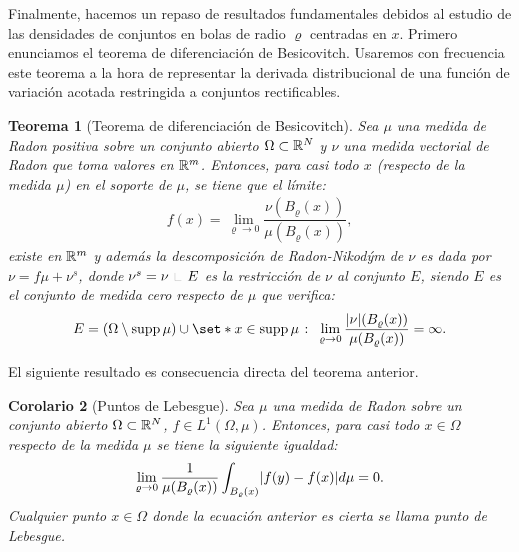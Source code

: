 \documentclass[a4paper,11pt,spanish, twoside, leqno]{tfm-uam}
\newtheorem{teo}{Teorema}[chapter]
\newtheorem{cor}[teo]{Corolario}
\begin{document}
Finalmente, hacemos un repaso de resultados fundamentales debidos al estudio de las densidades de conjuntos en bolas de radio $\varrho$ centradas en $x$. Primero enunciamos el teorema de diferenciación de Besicovitch. Usaremos con frecuencia este teorema a la hora de representar la derivada distribucional de una función de variación acotada restringida a conjuntos rectificables.
\begin{teo}[Teorema de diferenciación de Besicovitch]
Sea  $\mu$ una medida de Radon positiva sobre un conjunto abierto $\Omega\subset \mathbb{R}^{N}$ y $\nu$ una medida vectorial de Radon que toma  valores en $\mathbb{R}^{m}$. Entonces, para casi todo $x$ (respecto de la medida $\mu$) en el soporte de $\mu$, se tiene que el límite:
\begin{align}
f(x)=\lim_{\varrho\to 0}\dfrac{\nu(B_{\varrho}(x))}{\mu(B_{\varrho}(x))},
\end{align}
existe en $\mathbb{R}^{m}$ y además la descomposición de Radon-Nikod\'ym de $\nu$ es dada por $\nu=f\mu+\nu^{s}$, donde $\nu^{s}=\nu\Radot E$ es la restricción de $\nu$ al conjunto $E$, siendo $E$ es el conjunto de medida cero respecto de $\mu$ que verifica:
\begin{align*}
E=(\Omega\setminus \supp \mu)\cup \set*{x\in \supp \mu\given \lim_{\varrho\to 0}\dfrac{\abs{\nu}(B_{\varrho}(x))}{\mu(B_{\varrho}(x))}=\infty}.
\end{align*}
\end{teo}
El siguiente resultado es consecuencia directa del teorema anterior.
\begin{cor}[Puntos de Lebesgue]
Sea $\mu$ una medida de Radon sobre un conjunto abierto $\Omega\subset \mathbb{R}^{N}$, $f\in L^{1}(\Omega, \mu)$. Entonces, para casi todo $x\in \Omega$ respecto de la medida $\mu$ se tiene la siguiente igualdad:
\begin{align*}
\lim_{\varrho\to 0}	\dfrac{1}{\mu(B_{\varrho}(x))}\int_{B_{\varrho}(x)}\lvert f(y)-f(x)\rvert d\mu=0.
\end{align*}
Cualquier punto $x\in\Omega$ donde la ecuación anterior es cierta se llama punto de Lebesgue.
\end{cor}
 
\end{document}
